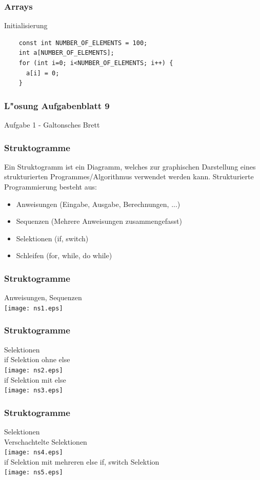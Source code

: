 \documentclass{beamer}
\begin{document}
\begin{frame}[fragile]
	\frametitle{Arrays}
        Initialisierung
	\begin{lstlisting}
	const int NUMBER_OF_ELEMENTS = 100;
	int a[NUMBER_OF_ELEMENTS];
	for (int i=0; i<NUMBER_OF_ELEMENTS; i++) {
	  a[i] = 0;
	}
	\end{lstlisting}
\end{frame}


\begin{frame}[fragile]
	\frametitle{L"osung Aufgabenblatt 9}
	Aufgabe 1 - Galtonsches Brett
	{\tiny
	
	}
\end{frame}

\begin{frame}[fragile]
	\frametitle{Struktogramme}
	Ein Struktogramm ist ein Diagramm, welches zur graphischen Darstellung eines
	strukturierten Programmes/Algorithmus verwendet werden kann. Strukturierte
	Programmierung besteht aus:
	\begin{itemize}
	\item Anweisungen (Eingabe, Ausgabe, Berechnungen, ...)
	\item Sequenzen (Mehrere Anweisungen zusammengefasst)
	\item Selektionen (if, switch)
	\item Schleifen (for, while, do while)
	\end{itemize}
\end{frame}

\begin{frame}[fragile]
	\frametitle{Struktogramme}
	Anweisungen, Sequenzen\\
	\texttt{[image: ns1.eps]}
		
\end{frame}

\begin{frame}[fragile]
	\frametitle{Struktogramme}
	Selektionen\\
	if Selektion ohne else\\
	\texttt{[image: ns2.eps]}\\
	if Selektion mit else\\
	\texttt{[image: ns3.eps]}
\end{frame}

\begin{frame}[fragile]
	\frametitle{Struktogramme}
	Selektionen\\
	Verschachtelte Selektionen\\
	\texttt{[image: ns4.eps]}\\
	if Selektion mit mehreren else if, switch Selektion\\
	\texttt{[image: ns5.eps]}
\end{frame}
\end{document}

